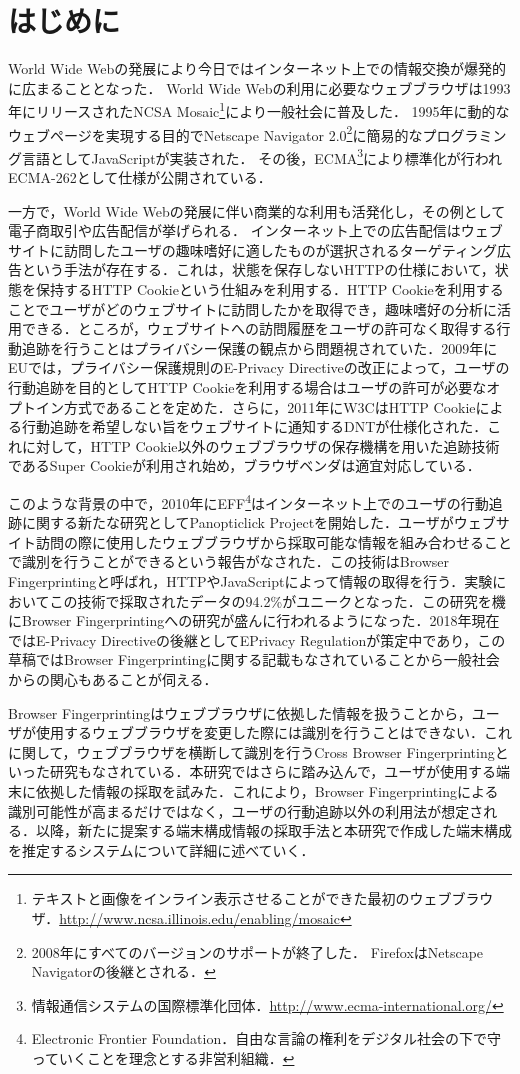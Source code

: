\section{はじめに}
World Wide Webの発展により今日ではインターネット上での情報交換が爆発的に広まることとなった．
World Wide Webの利用に必要なウェブブラウザは1993年にリリースされたNCSA Mosaic\footnote{テキストと画像をインライン表示させることができた最初のウェブブラウザ．\url{http://www.ncsa.illinois.edu/enabling/mosaic}}により一般社会に普及した．
1995年に動的なウェブページを実現する目的でNetscape Navigator 2.0\footnote{2008年にすべてのバージョンのサポートが終了した．
FirefoxはNetscape Navigatorの後継とされる．}に簡易的なプログラミング言語としてJavaScriptが実装された．
その後，ECMA\footnote{情報通信システムの国際標準化団体．\url{http://www.ecma-international.org/}}により標準化が行われECMA-262として仕様が公開されている\cite{ecma_262}．

一方で，World Wide Webの発展に伴い商業的な利用も活発化し，その例として電子商取引や広告配信が挙げられる．
インターネット上での広告配信はウェブサイトに訪問したユーザの趣味嗜好に適したものが選択されるターゲティング広告という手法が存在する．これは，状態を保存しないHTTPの仕様において，状態を保持するHTTP Cookieという仕組みを利用する．HTTP Cookieを利用することでユーザがどのウェブサイトに訪問したかを取得でき，趣味嗜好の分析に活用できる．ところが，ウェブサイトへの訪問履歴をユーザの許可なく取得する行動追跡を行うことはプライバシー保護の観点から問題視されていた．2009年にEUでは，プライバシー保護規則のE-Privacy Directiveの改正によって，ユーザの行動追跡を目的としてHTTP Cookieを利用する場合はユーザの許可が必要なオプトイン方式であることを定めた．さらに，2011年にW3CはHTTP Cookieによる行動追跡を希望しない旨をウェブサイトに通知するDNT\cite{dnt}が仕様化された．これに対して，HTTP Cookie以外のウェブブラウザの保存機構を用いた追跡技術であるSuper Cookieが利用され始め，ブラウザベンダは適宜対応している．

このような背景の中で，2010年にEFF\footnote{Electronic Frontier Foundation．自由な言論の権利をデジタル社会の下で守っていくことを理念とする非営利組織．}はインターネット上でのユーザの行動追跡に関する新たな研究としてPanopticlick Projectを開始した．ユーザがウェブサイト訪問の際に使用したウェブブラウザから採取可能な情報を組み合わせることで識別を行うことができるという報告がなされた\cite{eckersley2010unique}．この技術はBrowser Fingerprintingと呼ばれ，HTTPやJavaScriptによって情報の取得を行う．実験においてこの技術で採取されたデータの94.2\%がユニークとなった．この研究を機にBrowser Fingerprintingへの研究が盛んに行われるようになった．2018年現在ではE-Privacy Directiveの後継としてEPrivacy Regulationが策定中であり，この草稿ではBrowser Fingerprintingに関する記載もなされていることから一般社会からの関心もあることが伺える．

Browser Fingerprintingはウェブブラウザに依拠した情報を扱うことから，ユーザが使用するウェブブラウザを変更した際には識別を行うことはできない．これに関して，ウェブブラウザを横断して識別を行うCross Browser Fingerprintingといった研究もなされている．本研究ではさらに踏み込んで，ユーザが使用する端末に依拠した情報の採取を試みた．これにより，Browser Fingerprintingによる識別可能性が高まるだけではなく，ユーザの行動追跡以外の利用法が想定される．以降，新たに提案する端末構成情報の採取手法と本研究で作成した端末構成を推定するシステムについて詳細に述べていく．
